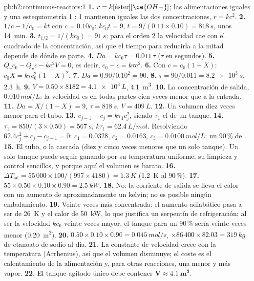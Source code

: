 \begin{solution}{pb:b2:continuous-reactors:1}
\textbf{1.} $r = k[\text{éster}][\ce{OH-}]$; las alimentaciones iguales y una estequiometría
1 : 1 mantienen iguales las dos concentraciones, $r = kc^2$.
\textbf{2.} $1/c - 1/c_0 = kt$ con $c = 0.10c_0$: $kc_0t = 9$, $t = 9/(0.11
\times 0.10) = \qty{818}{s}$, unos \qty{14}{min}.
\textbf{3.} $t_{1/2} = 1/(kc_0) = \qty{91}{s}$; para el orden 2 la velocidad cae con
el cuadrado de la concentración, así que el tiempo para reducirla a la mitad depende de dónde se
parte.
\textbf{4.} $Da = kc_0\tau = 0.011\,\tau$ ($\tau$ en segundos).
\textbf{5.} $Q_vc_0 - Q_vc - kc^2V = 0$, es decir, $c_0 - c = k\tau c^2$.
\textbf{6.} Con $c = c_0(1 - X)$: $c_0X = k\tau c_0^2(1 - X)^2$.
\textbf{7.} $Da = 0.90/0.10^2 = 90$.
\textbf{8.} $\tau = 90/0.011 = \qty{8.2e3}{s}$, \qty{2.3}{h}.
\textbf{9.} $V = 0.50 \times 8182 = \qty{4.1e3}{L}$, \qty{4.1}{m^3}.
\textbf{10.} La concentración de salida, $0.010\,\unit{mol/L}$: la velocidad es
en todas partes cien veces menor que a la entrada.
\textbf{11.} $Da = X/(1 - X) = 9$, $\tau = \qty{818}{s}$, $V = \qty{409}{L}$.
\textbf{12.} Un volumen diez veces menor para el tubo.
\textbf{13.} $c_{j-1} - c_j = k\tau_1c_j^2$, siendo $\tau_1$ el  de
un tanque.
\textbf{14.} $\tau_1 = 850/(3 \times 0.50) = \qty{567}{s}$, $k\tau_1 =
\qty{62.4}{L/mol}$. Resolviendo $62.4c_j^2 + c_j - c_{j-1} = 0$: $c_1 = 0.0328$,
$c_2 = 0.0163$, $c_3 = \qty{0.0100}{mol/L}$: un 90\,\% de .
\textbf{15.} El tubo, o la cascada (diez y cinco veces menores que un solo
tanque). Un solo tanque puede seguir ganando por su temperatura uniforme, su limpieza
y control sencillos, y porque aquí el volumen es barato.
\textbf{16.} $\Delta T_{\text{ad}} = 55\,000 \times 100/(997 \times 4180) =
\qty{1.3}{K}$ (\qty{1.2}{K} al 90\,\%).
\textbf{17.} $55 \times 0.50 \times 0.10 \times 0.90 = \qty{2.5}{kW}$.
\textbf{18.} No: la corriente de salida se lleva el calor con un aumento de aproximadamente
un kelvin; no es posible ningún embalamiento.
\textbf{19.} Veinte veces más concentrada: el aumento adiabático pasa a ser de
\qty{26}{K} y el calor de \qty{50}{kW}, lo que justifica un serpentín de refrigeración; al ser la velocidad $kc_0$
veinte veces mayor, el tanque para un 90\,\% sería veinte veces menor
(\qty{0.20}{m^3}).
\textbf{20.} $0.50 \times 0.10 \times 0.90 = \qty{0.045}{mol/s}$, $\times 86\,400
\times 82.03 = \qty{319}{kg}$ de etanoato de sodio al día.
\textbf{21.} La constante de velocidad crece con la temperatura (Arrhenius), así que el
volumen disminuye; el coste es el calentamiento de la alimentación y, para otras
reacciones, una  menor y más vapor.
\textbf{22.} El tanque agitado único debe contener $\boldsymbol{V \approx
\qty{4.1}{m^3}}$.
\end{solution}
